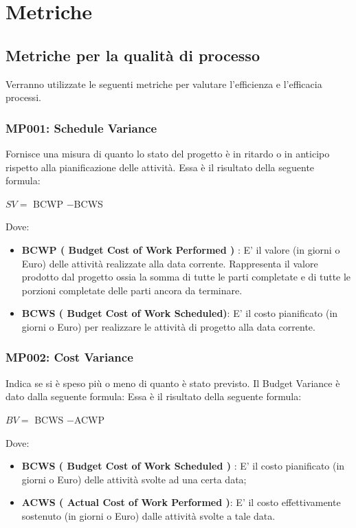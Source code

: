 \chapter{Metriche}
\section{Metriche per la qualità di processo}\label{processo}
Verranno utilizzate le seguenti metriche per valutare l'efficienza e l'efficacia 
processi.

\subsection{MP001: Schedule Variance}
Fornisce una misura di quanto lo stato del progetto è in ritardo o in anticipo rispetto alla pianificazione delle attività.
Essa è il risultato della seguente formula:\\
\begin{center}
	$SV = ${ BCWP} $-${BCWS}
\end{center}
Dove:
\begin{itemize}
		\item \textbf{ BCWP ( Budget Cost of Work Performed ) } : E' il valore (in giorni o Euro) delle attività realizzate alla data corrente. Rappresenta il valore prodotto dal progetto ossia la somma di tutte le parti completate e di tutte le porzioni completate delle parti ancora da terminare.
		\item \textbf{ BCWS ( Budget Cost of Work Scheduled)}: E' il costo pianificato (in giorni o Euro) per realizzare le attività di progetto alla data corrente.
\end{itemize}

\subsection{MP002: Cost  Variance }
Indica se si è speso più o meno di quanto è stato previsto.
Il Budget Variance è dato dalla seguente formula:
Essa è il risultato della seguente formula:\\
\begin{center}
	$BV = ${ BCWS} $-${ACWP}
\end{center}
Dove:
\begin{itemize}
	\item \textbf{ BCWS ( Budget Cost of Work Scheduled ) } : E' il costo pianificato (in giorni o Euro) delle attività svolte ad una certa data; 
	\item \textbf{ ACWS ( Actual Cost of Work Performed )}: E' il costo effettivamente sostenuto (in giorni o Euro) dalle attività svolte a tale data.
\end{itemize}

